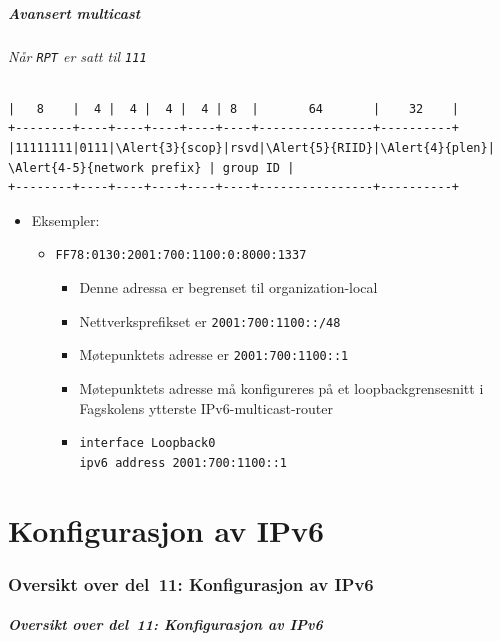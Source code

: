 \begin{frame}[fragile]%
  \frametitle{Avansert multicast}
  \framesubtitle{Når \texttt{RPT} er satt til \texttt{111}}
\begin{Verbatim}[commandchars=\\\{\},fontsize=\tiny]
|   8    |  4 |  4 |  4 |  4 | 8  |       64       |    32    |
+--------+----+----+----+----+----+----------------+----------+
|11111111|0111|\Alert{3}{scop}|rsvd|\Alert{5}{RIID}|\Alert{4}{plen}| \Alert{4-5}{network prefix} | group ID |
+--------+----+----+----+----+----+----------------+----------+
\end{Verbatim}
  \begin{itemize}[<+->]
  \item Eksempler:
    \begin{itemize}[<+->]
    \item \texttt{FF7\alert<3>{8}:0\alert<5>{1}\alert<4>{30}:\alert<4-5>{2001}:\alert<4-5>{700}:\alert<4-5>{1100}:\alert<4-5>{0}:8000:1337}
      \begin{itemize}[<+->]
      \item Denne adressa er begrenset til organization-local
      \item Nettverksprefikset er \texttt{\alert<4>{2001:700:1100}::/\alert<4>{48}}
      \item Møtepunktets adresse er \alert<6>{\texttt{\alert<5>{2001:700:1100}::\alert<5>{1}}}
      \item Møtepunktets adresse må konfigureres på et
        loopbackgrensesnitt i Fagskolens ytterste
        IPv6-multicast-router
      \item \texttt{interface Loopback0}\\
        \texttt{ipv6 address 2001:700:1100::1}
      \end{itemize}
    \end{itemize}
  \end{itemize}
\end{frame}

\part{Konfigurasjon av IPv6}

\begin{frame}
  \partpage
\end{frame}

\section*{Oversikt over del~11: Konfigurasjon av IPv6}
\begin{frame}[allowframebreaks]
  \frametitle{Oversikt over del~11: Konfigurasjon av IPv6}
    \tableofcontents%
\end{frame}

